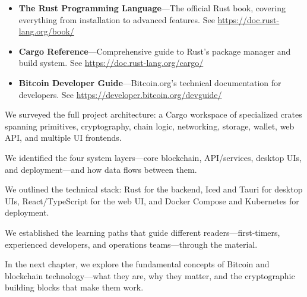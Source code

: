 \begin{itemize}
  \item \textbf{The Rust Programming Language}---The official Rust book, covering everything from installation to advanced features. See \url{https://doc.rust-lang.org/book/}
  \item \textbf{Cargo Reference}---Comprehensive guide to Rust's package manager and build system. See \url{https://doc.rust-lang.org/cargo/}
  \item \textbf{Bitcoin Developer Guide}---Bitcoin.org's technical documentation for developers. See \url{https://developer.bitcoin.org/devguide/}
\end{itemize}

\begin{chaptersummary}
  \item We surveyed the full project architecture: a Cargo workspace of specialized crates spanning primitives, cryptography, chain logic, networking, storage, wallet, web API, and multiple UI frontends.
  \item We identified the four system layers---core blockchain, API/services, desktop UIs, and deployment---and how data flows between them.
  \item We outlined the technical stack: Rust for the backend, Iced and Tauri for desktop UIs, React/TypeScript for the web UI, and Docker Compose and Kubernetes for deployment.
  \item We established the learning paths that guide different readers---first-timers, experienced developers, and operations teams---through the material.
  \item In the next chapter, we explore the fundamental concepts of Bitcoin and blockchain technology---what they are, why they matter, and the cryptographic building blocks that make them work.
\end{chaptersummary}
